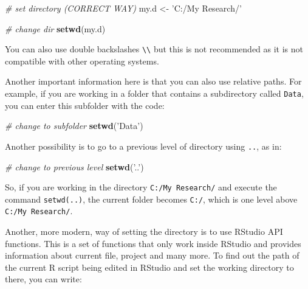 \documentclass[11pt,]{book}
\newenvironment{Shaded}{\begin{snugshade}}{\end{snugshade}}
\newcommand{\KeywordTok}[1]{\textcolor[rgb]{0.27,0.27,0.27}{\textbf{#1}}}
\newcommand{\StringTok}[1]{\textcolor[rgb]{0.5,0.5,0.5}{#1}}
\newcommand{\CommentTok}[1]{\textcolor[rgb]{0.56,0.35,0.01}{\textit{#1}}}
\newcommand{\OperatorTok}[1]{\textcolor[rgb]{0.81,0.36,0.00}{\textbf{#1}}}
\newcommand{\NormalTok}[1]{#1}
\begin{document}
\begin{Shaded}
\begin{Highlighting}[]
\CommentTok{# set directory (CORRECT WAY)}
\NormalTok{my.d <-}\StringTok{ 'C:/My Research/'}

\CommentTok{# change dir}
\KeywordTok{setwd}\NormalTok{(my.d)}
\end{Highlighting}
\end{Shaded}

You can also use double backslashes
\texttt{\textbackslash{}\textbackslash{}} but this is not recommended as
it is not compatible with other operating systems.

Another important information here is that you can also use relative
paths. For example, if you are working in a folder that contains a
subdirectory called \texttt{Data}, you can enter this subfolder with the
code:

\begin{Shaded}
\begin{Highlighting}[]
\CommentTok{# change to subfolder}
\KeywordTok{setwd}\NormalTok{(}\StringTok{'Data'}\NormalTok{)}
\end{Highlighting}
\end{Shaded}

Another possibility is to go to a previous level of directory using
\texttt{..}, as in:

\begin{Shaded}
\begin{Highlighting}[]
\CommentTok{# change to previous level}
\KeywordTok{setwd}\NormalTok{(}\StringTok{'..'}\NormalTok{)}
\end{Highlighting}
\end{Shaded}

So, if you are working in the directory \texttt{C:/My\ Research/} and
execute the command
\texttt{setwd(\textquotesingle{}..\textquotesingle{})}, the current
folder becomes \texttt{C:/}, which is one level above
\texttt{C:/My\ Research/}.

Another, more modern, way of setting the directory is to use RStudio API
functions. This is a set of functions that only work inside RStudio and
provides information about current file, project and many more. To find
out the path of the current R script being edited in RStudio and set the
working directory to there, you can write:

\begin{Shaded}
\end{Shaded}
\end{document}
